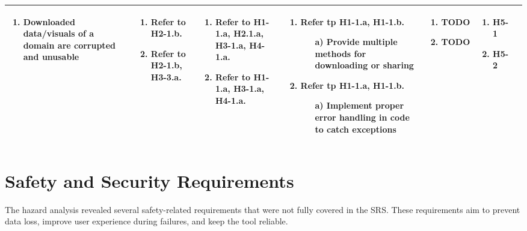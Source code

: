 \documentclass{article}
\begin{document}
\begin{landscape}
\begin{longtable}{|p{3cm}|p{3cm}|p{4cm}|p{4cm}|p{3cm}|p{2cm}|p{3cm}|}
\begin{enumerate}[leftmargin=*]
    \item Downloaded data/visuals of a domain are corrupted and unusable
  \end{enumerate} & 
  \begin{enumerate}[leftmargin=*]
      \item Refer to H2-1.b.
      \item Refer to H2-1.b, H3-3.a.
  \end{enumerate} &
  \begin{enumerate}[leftmargin=*]
    \item Refer to H1-1.a, H2.1.a, H3-1.a, H4-1.a.
    \item Refer to H1-1.a, H3-1.a, H4-1.a.
  \end{enumerate} &
  \begin{enumerate}[leftmargin=*]
       \item Refer tp H1-1.a, H1-1.b.
       \begin{enumerate}
        \item[a)] Provide multiple methods for downloading or sharing
    \end{enumerate}
       \item Refer tp H1-1.a, H1-1.b.
       \begin{enumerate}
        \item[a)] Implement proper error handling in code to catch exceptions
    \end{enumerate}
  \end{enumerate} &
  \begin{enumerate}[leftmargin=*]
       \item TODO
       \item TODO
  \end{enumerate} &
  \begin{enumerate}[leftmargin=*]
       \item H5-1
       \item H5-2
  \end{enumerate} \\
  \hline
  \end{longtable}
\end{landscape}
\restoregeometry


\section{Safety and Security Requirements}
The hazard analysis revealed several safety-related requirements that were not fully covered in the SRS.
These requirements aim to prevent data loss, improve user experience during failures, and keep the tool reliable.
\end{document}
